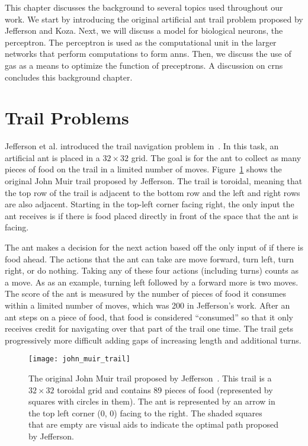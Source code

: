 \def\layerseptikznn{2.5cm}

This chapter discusses the background to several topics used throughout our work. We start by introducing the original artificial ant trail problem proposed by Jefferson and Koza. Next, we will discuss a model for biological neurons, the perceptron. The perceptron is used as the computational unit in the larger networks that perform computations to form \glspl{ann}. Then, we discuss the use of \glspl{ga} as a means to optimize the function of preceptrons.  A discussion on \glspl{crn} concludes this background chapter.

\section{Trail Problems}
\label{sec:trail_problems_bg}
Jefferson et al. introduced the trail navigation problem in~\cite{Jefferson1992-ph}. In this task, an artificial ant is placed in a $32 \times 32$ grid. The goal is for the ant to collect as many pieces of food on the trail in a limited number of moves. Figure~\ref{fig:johnmuirtrailimage} shows the original John Muir trail proposed by Jefferson. The trail is toroidal, meaning that the top row of the trail is adjacent to the bottom row and the left and right rows are also adjacent. Starting in the top-left corner facing right, the only input the ant receives is if there is food placed directly in front of the space that the ant is facing.

The ant makes a decision for the next action based off the only input of if there is food ahead. The actions that the ant can take are move forward, turn left, turn right, or do nothing. Taking any of these four actions (including turns) counts as a move. As as an example, turning left followed by a forward more is two moves. The score of the ant is measured by the number of pieces of food it consumes within a limited number of moves, which was 200 in Jefferson's work. After an ant steps on a piece of food, that food is considered ``consumed'' so that it only receives credit for navigating over that part of the trail one time. The trail gets progressively more difficult adding gaps of increasing length and additional turns.

\begin{figure}[tbp]
\centering
\texttt{[image: john\_muir\_trail]}
\caption[John Muir Trail]{The original John Muir trail proposed by Jefferson~\cite{Jefferson1992-ph}. This trail is a $32 \times 32$ toroidal grid and contains 89 pieces of food (represented by squares with circles in them). The ant is represented by an arrow in the top left corner (0, 0) facing to the right. The shaded squares that are empty are visual aids to indicate the optimal path proposed by Jefferson.}
\label{fig:johnmuirtrailimage}
\end{figure}


